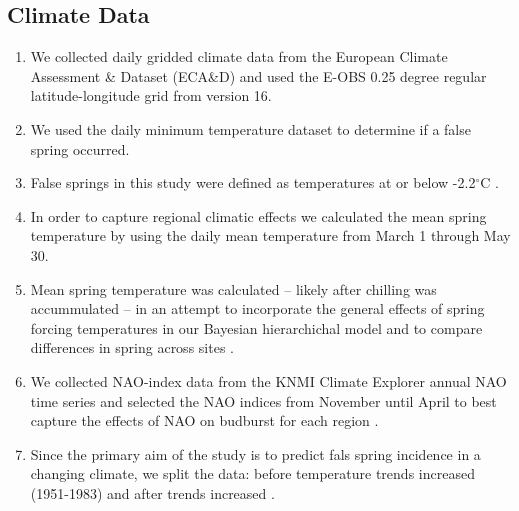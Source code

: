 \documentclass{article}\usepackage[]{graphicx}\usepackage[]{color}
\begin{document}
\subsection*{Climate Data}
\begin{enumerate}
\item We collected daily gridded climate data from the European Climate Assessment \& Dataset (ECA\&D) and used the E-OBS 0.25 degree regular latitude-longitude grid from version 16. 
\item We used the daily minimum temperature dataset to determine if a false spring occurred.
\item False springs in this study were defined as temperatures at or below -2.2$^{\circ}$C \citep{Schwartz1993}.
\item In order to capture regional climatic effects we calculated the mean spring temperature by using the daily mean temperature from March 1 through May 30.
\item Mean spring temperature was calculated -- likely after chilling was accummulated -- in an attempt to incorporate the general effects of spring forcing temperatures in our Bayesian hierarchichal model and to compare differences in spring across sites \citep{Basler2012, Korner2016}.
\item We collected NAO-index data from the KNMI Climate Explorer annual NAO time series and selected the NAO indices from November until April to best capture the effects of NAO on budburst for each region \citep{NAO}.
\item Since the primary aim of the study is to predict fals spring incidence in a changing climate, we split the data: before temperature trends increased (1951-1983) and after trends increased \citep[1984-2016,][]{Stocker2013, Kharouba2018}.
\end{enumerate}
\end{document}
